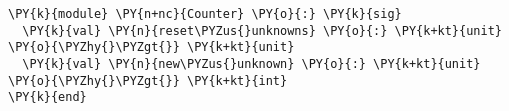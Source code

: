 \begin{Verbatim}[commandchars=\\\{\}]
\PY{k}{module} \PY{n+nc}{Counter} \PY{o}{:} \PY{k}{sig}
  \PY{k}{val} \PY{n}{reset\PYZus{}unknowns} \PY{o}{:} \PY{k+kt}{unit} \PY{o}{\PYZhy{}\PYZgt{}} \PY{k+kt}{unit}
  \PY{k}{val} \PY{n}{new\PYZus{}unknown} \PY{o}{:} \PY{k+kt}{unit} \PY{o}{\PYZhy{}\PYZgt{}} \PY{k+kt}{int}
\PY{k}{end}
\end{Verbatim}
